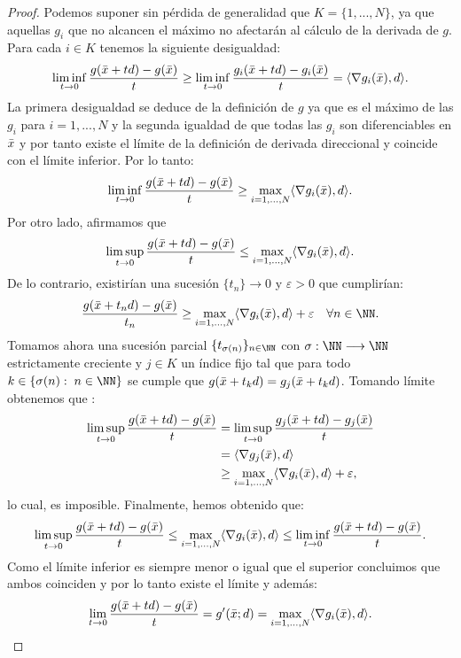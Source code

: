 	\begin{proof}
		Podemos suponer sin pérdida de generalidad que $ K = \{1, ..., N \} $, ya que aquellas $ g_i $ que no alcancen el máximo no afectarán al cálculo de la derivada de $ g $. Para cada $ i \in K $ tenemos la siguiente desigualdad:
		\begin{equation*}
			\liminf_{t\rightarrow0}\frac{g(\bar{x}+td) - g(\bar{x})}{t} \geq \liminf_{t\rightarrow0}\frac{g_i(\bar{x}+td) - g_i(\bar{x})}{t} = \langle \nabla g_i(\bar{x}), d \rangle.
		\end{equation*}	
		La primera desigualdad se deduce de la definición de $ g $ ya que es el máximo de las $ g_i $ para $ i=1,...,N$ y la segunda igualdad de que todas las $ g_i $ son diferenciables en $ \bar{x} $ y por tanto existe el límite de la definición de derivada direccional y coincide con el límite inferior. Por lo tanto:
		\[
		\liminf_{t\rightarrow0}\frac{g(\bar{x}+td) - g(\bar{x})}{t} \geq \max_{i=1,...,N}\langle \nabla g_i(\bar{x}), d \rangle.
		\]
		Por otro lado, afirmamos que 
		\begin{equation*}
			\limsup_{t\rightarrow0}\frac{g(\bar{x}+td) - g(\bar{x})}{t} \leq \max_{i=1,...,N}\langle \nabla g_i(\bar{x}), d \rangle.
		\end{equation*}
		De lo contrario, existirían una sucesión $ \{t_n\}\rightarrow 0 $ y $ \varepsilon > 0 $ que cumplirían:
		\[
		\frac{g(\barx+t_n d) - g(\barx)}{t_n} \geq \max_{i=1,...,N}\langle \nabla g_i(\barx), d \rangle + \varepsilon \quad \forall n \in \NN.
		\]
		Tomamos ahora una sucesión parcial $ \{t_{\sigma(n)}\}_{n \in \NN} $ con $ \sigma:\NN \longrightarrow \NN $ estrictamente creciente y $ j \in K $ un índice fijo tal que para todo $ k \in \{\sigma(n): \hspace{1mm} n\in \NN\} $ se cumple que $ g(\bar{x} + t_k d) = g_j (\bar{x} + t_k d)$. Tomando límite obtenemos que :
		\begin{equation*}
		\begin{split}
		\limsup_{t\rightarrow0}\frac{g(\bar{x}+td) - g(\bar{x})}{t} &= 	\limsup_{t\rightarrow0}\frac{g_j(\bar{x}+td) - g_j(\bar{x})}{t} \\
		&= \langle \nabla g_j(\bar{x}), d \rangle \\ &\geq \max_{i=1,...,N}\langle \nabla g_i(\bar{x}), d \rangle + \varepsilon,
		\end{split}
		\end{equation*}
		lo cual, es imposible. Finalmente, hemos obtenido que:
		\[
		\limsup_{t\rightarrow0}\frac{g(\bar{x}+td) - g(\bar{x})}{t} \leq \max_{i=1,...,N}\langle \nabla g_i(\bar{x}), d \rangle \leq 	\liminf_{t\rightarrow0}\frac{g(\bar{x}+td) - g(\bar{x})}{t}.
		\]
		Como el límite inferior es siempre menor o igual que el superior concluimos que ambos coinciden y por lo tanto existe el límite y además:
		\[
		\lim_{t\rightarrow0}\frac{g(\bar{x}+td) - g(\bar{x})}{t} = g'(\bar{x};d) = \max_{i=1,...,N}\langle \nabla g_i(\bar{x}), d \rangle.
		\]
	\end{proof}

